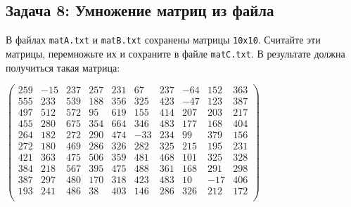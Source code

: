 \documentclass{article}
\begin{document}
\subsection*{Задача 8: Умножение матриц из файла}
В файлах \texttt{matA.txt} и \texttt{matB.txt} сохранены матрицы \texttt{10x10}. Считайте эти матрицы, перемножьте их и сохраните в файле \texttt{matC.txt}. В результате должна получиться такая матрица:
\begin{center}
$
\begin{pmatrix}
259 & -15 & 237 & 257 &  231 &  67  & 237  & -64  & 152  & 363 \\
555 & 233 & 539 & 188 &  356 &  325 &  423 &  -47 &  123 &  387 \\
497 & 512 & 572 & 95  & 619  & 155  & 414  & 207  & 203  & 217 \\
455 & 280 & 675 & 354 &  664 &  346 &  483 &  177 &  168 &  404 \\
264 & 182 & 272 & 290 &  474 &  -33 &  234 &  99  & 379  & 156 \\
272 & 180 & 469 & 286 &  326 &  282 &  325 &  215 &  195 &  231 \\
421 & 363 & 475 & 506 &  359 &  481 &  468 &  101 &  325 &  328 \\
384 & 218 & 567 & 395 &  475 &  488 &  361 &  168 &  291 &  298 \\
387 & 297 & 480 & 170 &  318 &  423 &  483 &  10  & -17  & 406 \\
193 & 241 & 486 & 38  & 403  & 146  & 286  & 326  & 212  & 172 \\
\end{pmatrix}
$
\end{center}
\end{document}
